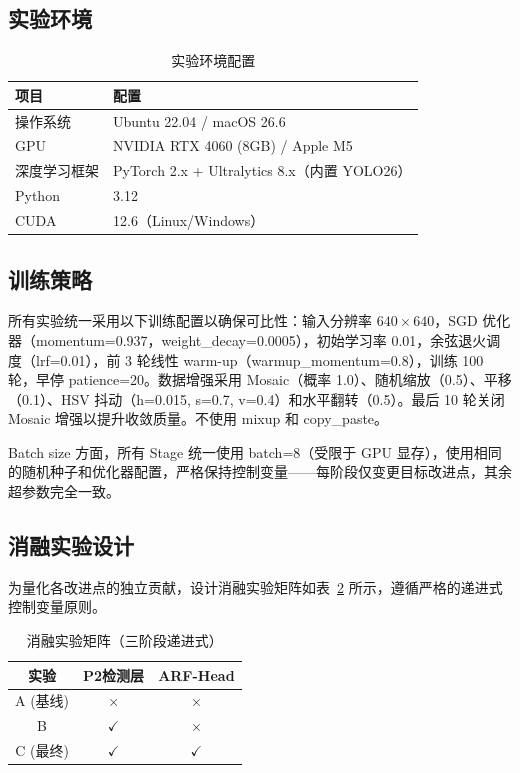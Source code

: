 \documentclass[12pt,a4paper,linespread=1.5,fontset=none]{ctexart}
\begin{document}
\subsection{实验环境}

\begin{table}[H]
\centering
\caption{实验环境配置}
\begin{tabular}{ll}
\toprule
\textbf{项目} & \textbf{配置} \\
\midrule
操作系统  & Ubuntu 22.04 / macOS 26.6 \\
GPU       & NVIDIA RTX 4060 (8GB) / Apple M5 \\
深度学习框架 & PyTorch 2.x + Ultralytics 8.x（内置 YOLO26） \\
Python    & 3.12 \\
CUDA      & 12.6（Linux/Windows） \\
\bottomrule
\end{tabular}
\label{tab:env}
\end{table}

\subsection{训练策略}

所有实验统一采用以下训练配置以确保可比性：输入分辨率 $640\times 640$，SGD 优化器（momentum=0.937，weight\_decay=0.0005），初始学习率 0.01，余弦退火调度（lrf=0.01），前 3 轮线性 warm-up（warmup\_momentum=0.8），训练 100 轮，早停 patience=20。数据增强采用 Mosaic（概率 1.0）、随机缩放（0.5）、平移（0.1）、HSV 抖动（h=0.015, s=0.7, v=0.4）和水平翻转（0.5）。最后 10 轮关闭 Mosaic 增强以提升收敛质量。不使用 mixup 和 copy\_paste。

Batch size 方面，所有 Stage 统一使用 batch=8（受限于 GPU 显存），使用相同的随机种子和优化器配置，严格保持控制变量——每阶段仅变更目标改进点，其余超参数完全一致。

\subsection{消融实验设计}

为量化各改进点的独立贡献，设计消融实验矩阵如表~\ref{tab:ablation} 所示，遵循严格的递进式控制变量原则。

\begin{table}[H]
\centering
\caption{消融实验矩阵（三阶段递进式）}
\begin{tabular}{ccc}
\toprule
\textbf{实验} & \textbf{P2检测层} & \textbf{ARF-Head} \\
\midrule
A (基线)    & $\times$ & $\times$ \\
B           & $\checkmark$ & $\times$ \\
C (最终)    & $\checkmark$ & $\checkmark$ \\
\bottomrule
\end{tabular}
\label{tab:ablation}
\end{table}
\end{document}
